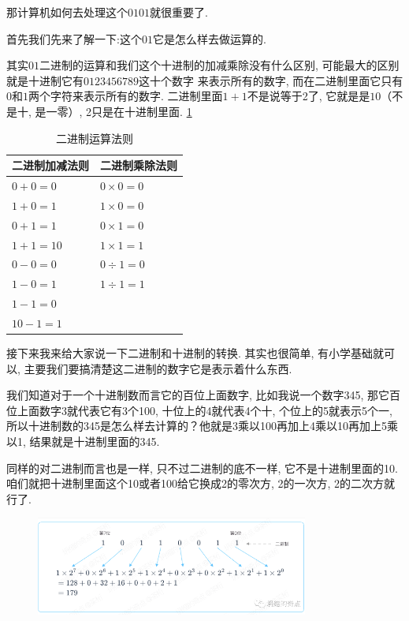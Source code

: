 那计算机如何去处理这个$0101$就很重要了. 

首先我们先来了解一下:这个$01$它是怎么样去做运算的. 

其实$01$二进制的运算和我们这个十进制的加减乘除没有什么区别, 可能最大的区别就是十进制它有$0123456789$这十个数字
来表示所有的数字, 而在二进制里面它只有$0$和$1$两个字符来表示所有的数字. 二进制里面$1+1$不是说等于2了, 它就是是$10$（不是十, 是一零）, 2只是在十进制里面. \ref{tab:table2_1}

\begin{table}[ht]
  \centering
  \begin{tabular}{ll}
    \toprule
    二进制加减法则  & 二进制乘除法则 \\
    \midrule
    $0+0=0$ & $0 \times 0=0$ \\
    $1+0=1$ & $1 \times  0=0$  \\
    $0+1=1$ & $0 \times  1=0$  \\
    $1+1=10$  & $1 \times  1=1$  \\
    $0-0=0$ & $0 \div 1=0 $ \\
    $1-0=1$ & $1 \div 1=1$  \\
    $1-1=0$ & \\
    $10 - 1=1$ &  \\
    \bottomrule
  \end{tabular}
  \caption{ 二进制运算法则}
  \label{tab:table2_1}
\end{table}

接下来我来给大家说一下二进制和十进制的转换. 其实也很简单, 有小学基础就可以, 主要我们要搞清楚这二进制的数字它是表示着什么东西. 

我们知道对于一个十进制数而言它的百位上面数字, 比如我说一个数字345, 那它百位上面数字3就代表它有3个100, 十位上的4就代表4个十, 个位上的5就表示5个一, 所以十进制数的345是怎么样去计算的？他就是3乘以100再加上4乘以10再加上5乘以1, 结果就是十进制里面的345. 

同样的对二进制而言也是一样, 只不过二进制的底不一样, 它不是十进制里面的10. 咱们就把十进制里面这个10或者100给它换成2的零次方, 2的一次方, 2的二次方就行了. 

\begin{figure}[ht]
  \centering\includegraphics[width=0.8\textwidth]{asset/20231227140607.png}
  \caption{}
  \label{fig:img2_12}
\end{figure}

